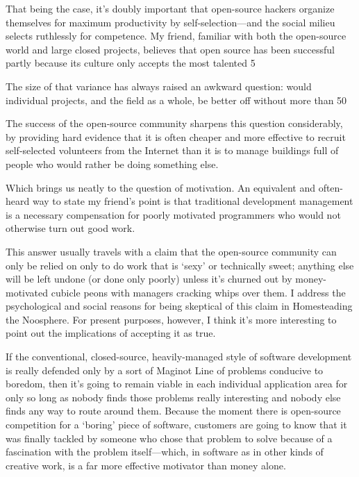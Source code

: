 \documentclass[a4paper,12pt,UTF8,twoside]{ctexbook}
\begin{document}
That being the case, it's doubly important that open-source hackers organize themselves for maximum productivity by self-selection—and the social milieu selects ruthlessly for competence. My friend, familiar with both the open-source world and large closed projects, believes that open source has been successful partly because its culture only accepts the most talented 5%

The size of that variance has always raised an awkward question: would individual projects, and the field as a whole, be better off without more than 50%

The success of the open-source community sharpens this question considerably, by providing hard evidence that it is often cheaper and more effective to recruit self-selected volunteers from the Internet than it is to manage buildings full of people who would rather be doing something else.

Which brings us neatly to the question of motivation. An equivalent and often-heard way to state my friend's point is that traditional development management is a necessary compensation for poorly motivated programmers who would not otherwise turn out good work.

This answer usually travels with a claim that the open-source community can only be relied on only to do work that is `sexy' or technically sweet; anything else will be left undone (or done only poorly) unless it's churned out by money-motivated cubicle peons with managers cracking whips over them. I address the psychological and social reasons for being skeptical of this claim in Homesteading the Noosphere. For present purposes, however, I think it's more interesting to point out the implications of accepting it as true.

If the conventional, closed-source, heavily-managed style of software development is really defended only by a sort of Maginot Line of problems conducive to boredom, then it's going to remain viable in each individual application area for only so long as nobody finds those problems really interesting and nobody else finds any way to route around them. Because the moment there is open-source competition for a `boring' piece of software, customers are going to know that it was finally tackled by someone who chose that problem to solve because of a fascination with the problem itself—which, in software as in other kinds of creative work, is a far more effective motivator than money alone.
\end{document}
